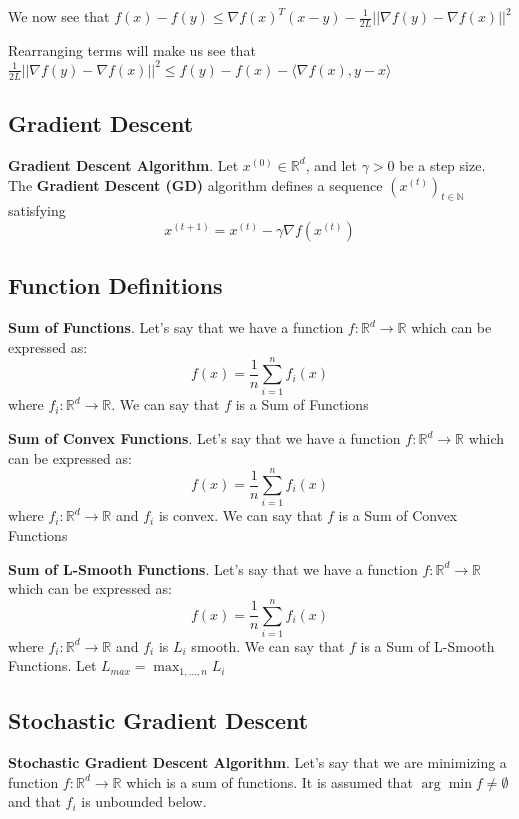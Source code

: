 We now see that $f(x) - f(y) \leq \nabla f(x)^T (x - y) - \frac{1}{2L} ||\nabla f(y) - \nabla f(x)||^2$

Rearranging terms will make us see that $\frac{1}{2L} ||\nabla f(y) - \nabla f(x)||^2 \leq f(y) - f(x) - \langle \nabla f(x), y - x \rangle$
\subsection{Gradient Descent}
\noindent \textbf{Gradient Descent Algorithm}. Let $x^{(0)} \in \mathbb{R}^d$, and let $\gamma > 0$ be a step size. The \textbf{Gradient Descent (GD)} algorithm defines a sequence $(x^{(t)})_{t \in \mathbb{N}}$ satisfying
\begin{equation}
    x^{(t + 1)}  = x^{(t)} - \gamma \nabla f(x^{(t)})
\end{equation}

\subsection{Function Definitions}
\noindent \textbf{Sum of Functions}. Let's say that we have a function $f: \mathbb{R}^d \rightarrow \mathbb{R}$ which can be expressed as: 
\begin{equation}
    f(x) = \frac{1}{n} \sum_{i=1}^{n} f_i(x)
\end{equation}
where $f_i: \mathbb{R}^d \rightarrow \mathbb{R}$. We can say that $f$ is a Sum of Functions

\noindent \textbf{Sum of Convex Functions}. Let's say that we have a function $f: \mathbb{R}^d \rightarrow \mathbb{R}$ which can be expressed as: 
\begin{equation}
    f(x) = \frac{1}{n} \sum_{i=1}^{n} f_i(x)
\end{equation}
where $f_i: \mathbb{R}^d \rightarrow \mathbb{R}$ and $f_i$ is convex. We can say that $f$ is a Sum of Convex Functions

\noindent \textbf{Sum of L-Smooth Functions}. Let's say that we have a function $f: \mathbb{R}^d \rightarrow \mathbb{R}$ which can be expressed as: 
\begin{equation}
    f(x) = \frac{1}{n} \sum_{i=1}^{n} f_i(x)
\end{equation}
where $f_i: \mathbb{R}^d \rightarrow \mathbb{R}$ and $f_i$ is $L_i$ smooth. We can say that $f$ is a Sum of L-Smooth Functions. Let $L_{max} = \max_{1, \dots, n} L_i$

\subsection{Stochastic Gradient Descent}
\noindent \textbf{Stochastic Gradient Descent Algorithm}. Let's say that we are minimizing a function $f: \mathbb{R}^d \rightarrow \mathbb{R}$ which is a sum of functions. It is assumed that $\arg \min f \neq \emptyset$ and that $f_i$ is unbounded below.  

